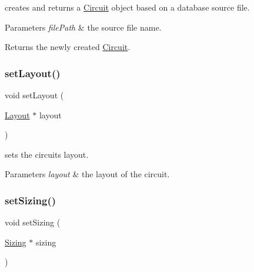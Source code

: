 creates and returns a \mbox{\hyperlink{class_open_chams_1_1_circuit}{Circuit}} object based on a database source file. 


\begin{DoxyParams}{Parameters}
{\em file\+Path} & the source file name.\\
\hline
\end{DoxyParams}
\begin{DoxyReturn}{Returns}
the newly created \mbox{\hyperlink{class_open_chams_1_1_circuit}{Circuit}}. 
\end{DoxyReturn}
\mbox{\label{class_open_chams_1_1_circuit_a4babcbc5b9f7797cc0befb675d5f538c}} 
\subsubsection{\texorpdfstring{set\+Layout()}{setLayout()}}
{\footnotesize\ttfamily void set\+Layout (\begin{DoxyParamCaption}\item[{\mbox{\hyperlink{class_open_chams_1_1_layout}{Layout}} $\ast$}]{layout }\end{DoxyParamCaption})\hspace{0.3cm}{\ttfamily [inline]}}



sets the circuit\textquotesingle{}s layout. 


\begin{DoxyParams}{Parameters}
{\em layout} & the layout of the circuit. \\
\hline
\end{DoxyParams}
\mbox{\label{class_open_chams_1_1_circuit_ab065572c5c1d9beb304324f2d2d8b525}} 
\subsubsection{\texorpdfstring{set\+Sizing()}{setSizing()}}
{\footnotesize\ttfamily void set\+Sizing (\begin{DoxyParamCaption}\item[{\mbox{\hyperlink{class_open_chams_1_1_sizing}{Sizing}} $\ast$}]{sizing }\end{DoxyParamCaption})\hspace{0.3cm}{\ttfamily [inline]}}



